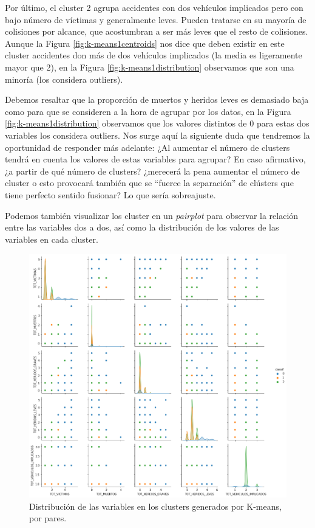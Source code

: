 \documentclass[oneside]{book}
\begin{document}
Por último, el cluster 2 agrupa accidentes con dos vehículos
implicados pero con bajo número de víctimas y generalmente
leves. Pueden tratarse en su mayoría de colisiones por alcance, que
acostumbran a ser más leves que el resto de colisiones. Aunque la
Figura \ref{fig:k-means1centroids} nos dice que deben existir en este
cluster accidentes don más de dos vehículos implicados (la media es
ligeramente mayor que 2), en la Figura \ref{fig:k-means1distribution}
observamos que son una minoría (los considera outliers).

Debemos resaltar que la proporción de muertos y heridos leves es
demasiado baja como para que se consideren a la hora de agrupar por
los datos, en la Figura \ref{fig:k-means1distribution} observamos que
los valores distintos de 0 para estas dos variables los considera
outliers. Nos surge aquí la siguiente duda que tendremos la
oportunidad de responder más adelante: ¿Al aumentar el número de
clusters tendrá en cuenta los valores de estas variables para agrupar?
En caso afirmativo, ¿a partir de qué número de clusters? ¿merecerá la
pena aumentar el número de cluster o esto provocará también que se
``fuerce la separación'' de clústers que tiene perfecto sentido
fusionar? Lo que sería sobreajuste.

Podemos también visualizar los cluster en un \textit{pairplot} para
observar la relación entre las variables dos a dos, así como la
distribución de los valores de las variables en cada cluster.

\begin{figure}[H]
  \centering
  \includegraphics[width=180mm]{figures/accidentes/k-means1pair}
  \caption{Distribución de las variables en los clusters generados por
    K-means, por pares.}
  \label{fig:k-means1pair}
\end{figure}
\end{document}
